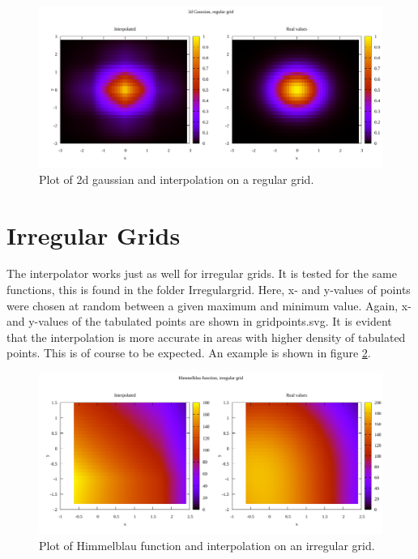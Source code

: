 \documentclass[a4paper, UKenglish]{article}
\begin{document}
\begin{figure}
	\includegraphics[width=\linewidth]{regular.pdf}
	\caption{Plot of 2d gaussian and interpolation on a regular grid.}
	\label{fig:regular}
\end{figure}

\section{Irregular Grids}
The interpolator works just as well for irregular grids. It is tested for the same functions, this is found in the folder Irregular\textunderscore{}grid. Here, x- and y-values of points were chosen at random between a given maximum and minimum value. Again, x- and y-values of the tabulated points are shown in gridpoints.svg. It is evident that the interpolation is more accurate in areas with higher density of tabulated points. This is of course to be expected. An example is shown in figure \ref{fig:irregular}.





\begin{figure}
	\includegraphics[width=\linewidth]{irregular.pdf}
	\caption{Plot of Himmelblau function and interpolation on an irregular grid.}
	\label{fig:irregular}
\end{figure}
\end{document}
